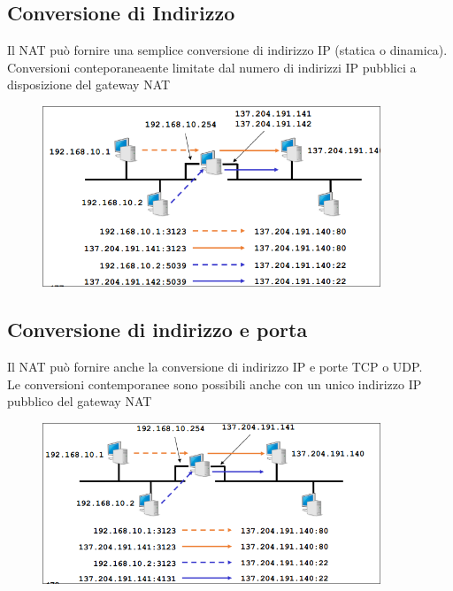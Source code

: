 \documentclass{report}
\begin{document}
            \subsection{Conversione di Indirizzo}
                Il NAT può fornire una semplice conversione di indirizzo IP (statica o dinamica).
                \\
                Conversioni conteporaneaente limitate dal numero di indirizzi IP pubblici a disposizione del gateway NAT
                \begin{figure}[H]
                    \includegraphics[width=0.9\textwidth]{2/convInd.png}
                \end{figure}
            \subsection{Conversione di indirizzo e porta}
                Il NAT può fornire anche la conversione di indirizzo IP e porte TCP o UDP.
                \\
                Le conversioni contemporanee sono possibili anche con un unico indirizzo IP pubblico del gateway NAT 
                \begin{figure}[H]
                    \includegraphics[width=0.9\textwidth]{2/pc.png}
                \end{figure}
\end{document}

